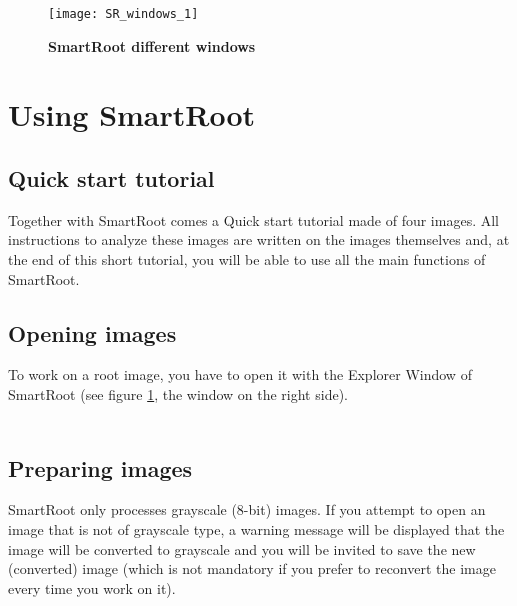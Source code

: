 \documentclass[a4paper,english,10pt]{report}
\begin{document}
\begin{figure}[!hbtp]
\begin{center}
\texttt{[image: SR\_windows\_1]}
\caption[]{\textbf{SmartRoot different windows}}
\label{sr_win}
\end{center}
\end{figure}

\chapter{Using SmartRoot}

{\color{coolSection}\section{Quick start tutorial}}

Together with SmartRoot comes a Quick start tutorial made of four images. All instructions to analyze these images are written on the images themselves and, at the end of this short tutorial, you will be able to use all the main functions of SmartRoot.


{\color{coolSection}\section{Opening images}}

To work on a root image, you have to open it with the Explorer Window of SmartRoot (see figure \ref{sr_win}, the window on the right side).\\

\noindent
{}\\


{\color{coolSection}\section{Preparing images}}

SmartRoot only processes grayscale (8-bit) images. If you attempt to open an image that is not of grayscale type, a warning message will be displayed that the image will be converted to grayscale and you will be invited to save the new (converted) image (which is not mandatory if you prefer to reconvert the image every time you work on it).\\
\end{document}
